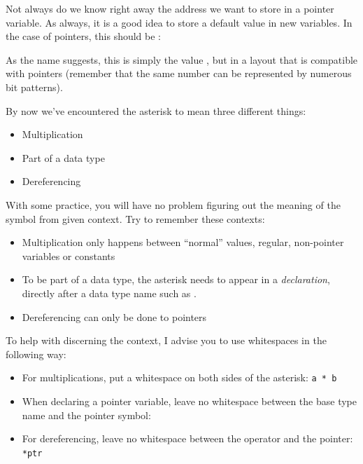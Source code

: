{{{{\begin{hintbox}
Not always do we know right away the address we want to store in a pointer variable. As always, it is a good idea to store a default value in new variables. In the case of pointers, this should be :
\vspace{3pt}

\vspace{-9pt}
As the name suggests, this is simply the value , but in a layout that is compatible with pointers (remember that the same number can be represented by numerous bit patterns).
\end{hintbox}

\begin{hintbox}
By now we've encountered the asterisk to mean three different things:
\begin{itemize}
\item Multiplication
\item Part of a data type
\item Dereferencing
\end{itemize}

With some practice, you will have no problem figuring out the meaning of the symbol from given context. Try to remember these contexts:
\begin{itemize}
\item Multiplication only happens between \enquote{normal} values, \ie regular, non-pointer variables or constants
\item To be part of a data type, the asterisk needs to appear in a \emph{declaration}, \ie directly after a data type name such as .
\item Dereferencing can only be done to pointers
\end{itemize}

To help with discerning the context, I advise you to use whitespaces in the following way:
\begin{itemize}
\item For multiplications, put a whitespace on both sides of the asterisk: \texttt{a * b}
\item When declaring a pointer variable, leave no whitespace between the base type name and the pointer symbol: 
\item For dereferencing, leave no whitespace between the operator and the pointer: \texttt{*ptr}
\end{itemize}
\end{hintbox}

}}}}
